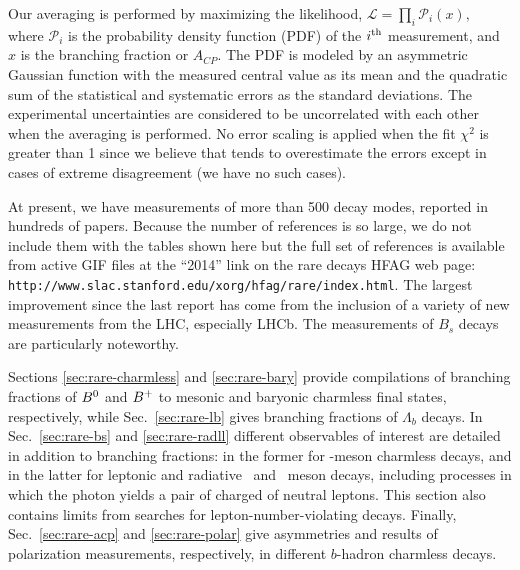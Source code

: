 Our averaging is performed by maximizing the likelihood,
   $\displaystyle {\mathcal L} = \prod_i {\mathcal P}_i(x),$  
where ${\mathcal P_i}$ is the probability density function (PDF) of the
$i^{\rm th}$  measurement, and $x$ is the branching fraction or $A_{CP}$.
The PDF is modeled by an asymmetric Gaussian function with the measured
central value as its mean and the quadratic sum of the statistical
and systematic errors as the standard deviations. The experimental
uncertainties are considered to be uncorrelated with each other when the 
averaging is performed. No error scaling is applied when the fit $\chi^2$ is 
greater than 1 since we believe that tends to overestimate the errors
except in cases of extreme disagreement (we have no such cases).

At present, we have measurements of more than 500 decay modes, reported in
hundreds of 
papers. Because the number of references is so large, we do
not include them with the tables shown here but the full set of
references is available from active GIF files at the 
``2014'' link on 
the rare decays HFAG web page: {\tt http://www.slac.stanford.edu/xorg/hfag/rare/index.html}.
The largest improvement since the last report has come from the inclusion of a
variety of new measurements from the LHC, especially LHCb.  The
measurements of $B_s$ decays are particularly noteworthy.

Sections \ref{sec:rare-charmless} and \ref{sec:rare-bary} provide compilations of branching fractions of $B^0$ and $B^{+}$ to mesonic and baryonic charmless final states, respectively, 
while Sec.~\ref{sec:rare-lb} gives branching fractions of $\Lambda_b$ decays.
In Sec.~\ref{sec:rare-bs} and \ref{sec:rare-radll} different observables of interest are detailed in addition to branching fractions: in the former for \Bs-meson charmless decays, and in the latter for leptonic and radiative \Bz\ and \Bp\ meson decays, including processes in which the photon yields a pair of charged of neutral leptons. This section also contains limits from searches for lepton-number-violating decays.
Finally, Sec.~\ref{sec:rare-acp} and \ref{sec:rare-polar} give \CP asymmetries and results of polarization measurements, respectively, in different $b$-hadron charmless decays.



